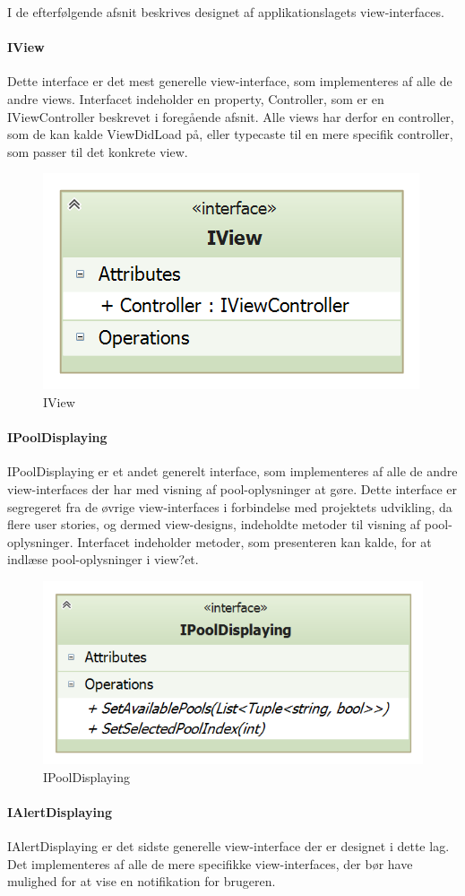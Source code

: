 I de efterfølgende afsnit beskrives designet af applikationslagets view-interfaces.

\paragraph{IView}
Dette interface er det mest generelle view-interface, som implementeres af alle de andre views. Interfacet indeholder en property, Controller, som er en IViewController beskrevet i foregående afsnit. Alle views har derfor en controller, som de kan kalde ViewDidLoad på, eller typecaste til en mere specifik controller, som passer til det konkrete view.

\begin{figure}
	\centering
	\includegraphics[width=0.3\linewidth]{figs/design/application_iview}
	\caption{IView}
	\label{fig:application_iview}
\end{figure}

\paragraph{IPoolDisplaying}
IPoolDisplaying er et andet generelt interface, som implementeres af alle de andre view-interfaces der har med visning af pool-oplysninger at gøre. Dette interface er segregeret fra de øvrige view-interfaces i forbindelse med projektets udvikling, da flere user stories, og dermed view-designs, indeholdte metoder til visning af pool-oplysninger. Interfacet indeholder metoder, som presenteren kan kalde, for at indlæse pool-oplysninger i view?et.

\begin{figure}
	\centering
	\includegraphics[width=0.4\linewidth]{figs/design/application_ipooldisplaying}
	\caption{IPoolDisplaying}
	\label{fig:application_ipooldisplaying}
\end{figure}

\paragraph{IAlertDisplaying}
IAlertDisplaying er det sidste generelle view-interface der er designet i dette lag. Det implementeres af alle de mere specifikke view-interfaces, der bør have mulighed for at vise en notifikation for brugeren.

